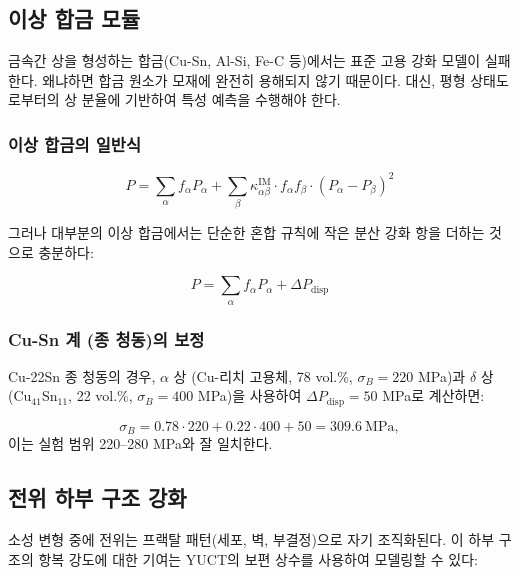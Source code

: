 \documentclass[12pt,a4paper]{article}
\begin{document}
	\subsection{이상 합금 모듈}
	\label{subsec:two-phase-alloys}
	
	금속간 상을 형성하는 합금(Cu-Sn, Al-Si, Fe-C 등)에서는 표준 고용 강화 모델이 실패한다. 왜냐하면 합금 원소가 모재에 완전히 용해되지 않기 때문이다. 대신, 평형 상태도로부터의 상 분율에 기반하여 특성 예측을 수행해야 한다.
	
	\subsubsection{이상 합금의 일반식}
	
	\begin{equation}
		\boxed{P = \sum_{\alpha} f_{\alpha} P_{\alpha} + \sum_{\beta} \kappa_{\alpha\beta}^{\text{IM}} \cdot f_{\alpha} f_{\beta} \cdot (P_{\alpha} - P_{\beta})^2}
		\label{eq:two-phase-alloy}
	\end{equation}
	
	그러나 대부분의 이상 합금에서는 단순한 혼합 규칙에 작은 분산 강화 항을 더하는 것으로 충분하다:
	
	\begin{equation}
		\boxed{P = \sum_{\alpha} f_{\alpha} P_{\alpha} + \Delta P_{\text{disp}}}
		\label{eq:two-phase-simple}
	\end{equation}
	
	\subsubsection{Cu-Sn 계 (종 청동)의 보정}
	Cu-22Sn 종 청동의 경우, \(\alpha\) 상 (Cu-리치 고용체, 78 vol.\%, \(\sigma_B=220\) MPa)과 \(\delta\) 상 (Cu\(_{41}\)Sn\(_{11}\), 22 vol.\%, \(\sigma_B=400\) MPa)을 사용하여 \(\Delta P_{\text{disp}}=50\) MPa로 계산하면:
	
	\[
	\sigma_B = 0.78 \cdot 220 + 0.22 \cdot 400 + 50 = 309.6\ \text{MPa},
	\]
	이는 실험 범위 220–280 MPa와 잘 일치한다.
	
	\subsection{전위 하부 구조 강화}
	\label{subsec:dislocation-substructure}
	
	소성 변형 중에 전위는 프랙탈 패턴(세포, 벽, 부결정)으로 자기 조직화된다. 이 하부 구조의 항복 강도에 대한 기여는 YUCT의 보편 상수를 사용하여 모델링할 수 있다:
	
\end{document}

